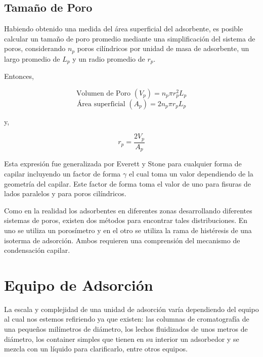 \documentclass[11pt]{book}
\begin{document}
\subsection{Tamaño de Poro}

Habiendo obtenido una medida del área superficial del adsorbente, es posible calcular un tamaño de poro promedio mediante una simplificación del sistema de poros, considerando $n_p$ poros cilíndricos por unidad de masa de adsorbente, un largo promedio de $L_p$ y un radio promedio de $r_p$.

Entonces,

\begin{equation*}
    \label{eq:PoroSize}
    \textrm{Volumen de Poro }(V_p) = n_p \pi r_p^2 L_p
\end{equation*}
\begin{equation*}
    \textrm{Área superficial }(A_p) = 2n_p \pi r_p L_p
\end{equation*}

y,

\begin{equation}
    \label{eq:radioporo_1}
    r_p = \frac{2V_p}{A_p}
\end{equation}

Esta expresión fue generalizada por Everett y Stone para cualquier forma de capilar incluyendo un factor de forma $\gamma$ el cual toma un valor dependiendo de la geometría del capilar. Este factor de forma toma el valor de uno para fisuras de lados paralelos y para poros cilíndricos. 

Como en la realidad los adsorbentes en diferentes zonas desarrollando diferentes sistemas de poros, existen dos métodos para encontrar tales distribuciones. En uno se utiliza un porosímetro y en el otro se utiliza la rama de histéresis de una isoterma de adsorción. Ambos requieren una comprensión del mecanismo de condensación capilar.

\section{Equipo de Adsorción}

La escala y complejidad de una unidad de adsorción varía dependiendo del equipo al cual nos estemos refiriendo ya que existen: las columnas de cromatografía de una pequeños milímetros de diámetro, los lechos fluidizados de unos metros de diámetro, los container simples que tienen en su interior un adsorbedor y se mezcla con un líquido para clarificarlo, entre otros equipos.
\end{document}
